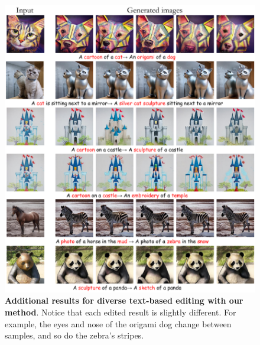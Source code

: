 \begin{figure}
\includegraphics[width=\textwidth]{ICCV23_submission/figures/DDPM_inversion_variability_2.pdf}
\caption{\textbf{Additional results for diverse text-based editing with our method}. Notice that 
each edited result is slightly different. For example, the eyes and nose of the origami dog change between samples, and so do the zebra's stripes.}
\label{fig:variability2}
\end{figure}








